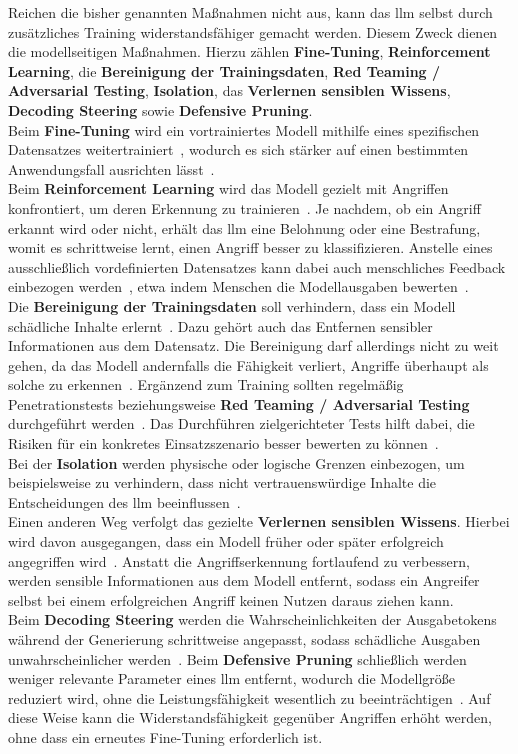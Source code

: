 Reichen die bisher genannten Maßnahmen nicht aus, kann das \ac{llm} selbst durch zusätzliches Training widerstandsfähiger gemacht werden. Diesem Zweck dienen die
modellseitigen Maßnahmen. Hierzu zählen \textbf{Fine-Tuning}, \textbf{Reinforcement Learning}, die \textbf{Bereinigung der Trainingsdaten}, \textbf{Red Teaming / Adversarial Testing},
\textbf{Isolation}, das \textbf{Verlernen sensiblen Wissens}, \textbf{Decoding Steering} sowie \textbf{Defensive Pruning}. \\
Beim \textbf{Fine-Tuning} wird ein vortrainiertes Modell mithilfe eines spezifischen Datensatzes weitertrainiert~\cite{sm14}, wodurch es sich stärker auf einen bestimmten
Anwendungsfall ausrichten lässt~\cite[7]{sm09}. \\
Beim \textbf{Reinforcement Learning} wird das Modell gezielt mit Angriffen konfrontiert, um deren Erkennung zu trainieren~\cite{sm07}. Je nachdem, ob ein Angriff erkannt wird
oder nicht, erhält das \ac{llm} eine Belohnung oder eine Bestrafung, womit es schrittweise lernt, einen Angriff besser zu klassifizieren.
Anstelle eines ausschließlich vordefinierten Datensatzes kann dabei auch menschliches Feedback
einbezogen werden~\cite{sm04}, etwa indem Menschen die Modellausgaben bewerten~\cite[8]{sm10}. \\
Die \textbf{Bereinigung der Trainingsdaten} soll verhindern, dass ein Modell schädliche Inhalte erlernt~\cite{pi14}. Dazu gehört auch das Entfernen sensibler Informationen aus
dem Datensatz. Die Bereinigung darf allerdings nicht zu weit gehen, da das Modell andernfalls die Fähigkeit verliert, Angriffe überhaupt als solche zu erkennen~\cite[13]{sm10}.
Ergänzend zum Training sollten regelmäßig Penetrationstests beziehungsweise \textbf{Red Teaming / Adversarial Testing} durchgeführt werden~\cite[4]{sm08}\cite{pi15}. 
Das Durchführen zielgerichteter Tests hilft dabei, die Risiken für ein konkretes Einsatzszenario besser bewerten zu können~\cite[4]{sm08}. \\
Bei der \textbf{Isolation} werden physische oder logische Grenzen einbezogen, um beispielsweise zu verhindern, dass nicht vertrauenswürdige Inhalte die Entscheidungen des \ac{llm}
beeinflussen~\cite[8]{sm09}. \\
Einen anderen Weg verfolgt das gezielte \textbf{Verlernen sensiblen Wissens}. Hierbei wird davon ausgegangen, dass ein Modell früher oder später erfolgreich angegriffen wird~\cite[8]{sm10}.
Anstatt die Angriffserkennung fortlaufend zu verbessern, werden sensible Informationen aus dem Modell entfernt, sodass ein Angreifer selbst bei einem erfolgreichen Angriff
keinen Nutzen daraus ziehen kann. \\
Beim \textbf{Decoding Steering} werden die Wahrscheinlichkeiten der Ausgabetokens während der Generierung schrittweise angepasst, sodass schädliche Ausgaben unwahrscheinlicher
werden~\cite[11]{sm10}. Beim \textbf{Defensive Pruning} schließlich werden weniger relevante Parameter eines \ac{llm} entfernt, wodurch die Modellgröße reduziert wird, ohne die
Leistungsfähigkeit wesentlich zu beeinträchtigen~\cite[11]{sm10}. Auf diese Weise kann die Widerstandsfähigkeit gegenüber Angriffen erhöht werden, ohne dass ein
erneutes Fine-Tuning erforderlich ist.

